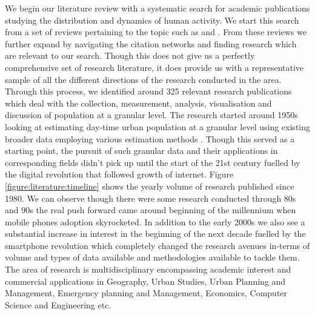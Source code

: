 We begin our literature review with a systematic search for academic publications studying the distribution and dynamics of human activity.
We start this search from a set of reviews pertaining to the topic such as \citet{ratti2006,jiang2013,steenbruggen2013,arribas-bel2014} and \citet{li2016geospatial}.
From these reviews we further expand by navigating the citation networks and finding research which are relevant to our search.
Though this does not give us a perfectly comprehensive set of research literature, it does provide us with a representative sample of all the different directions of the research conducted in the area.
Through this process, we identified around 325 relevant research publications which deal with the collection, measurement, analysis, visualisation and discussion of population at a granular level.
The research started around 1950s looking at estimating day-time urban population at a granular level using existing  broader data employing various estimation methods \cite{foley1954}\cite{schmitt1956}.
Though this served as a starting point, the pursuit of such granular data and their applications in corresponding fields didn't pick up until the start of the 21st century fuelled by the digital revolution that followed growth of internet.
Figure \ref{figure:literature:timeline} shows the yearly volume of research published since 1980.
We can observe though there were some research conducted through 80s and 90s the real push forward came around beginning of the millennium when mobile phones adoption skyrocketed.
In addition to the early 2000s we also see a substantial increase in interest in the beginning of the next decade fuelled by the smartphone revolution which completely changed the research avenues in-terms of volume and types of data available and methodologies available to tackle them.
The area of research is multidisciplinary encompassing academic interest and commercial applications in Geography, Urban Studies, Urban Planning and Management, Emergency planning and Management, Economics, Computer Science and Engineering etc.







